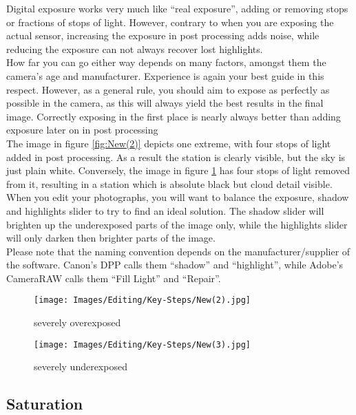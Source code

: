 Digital \gls{exposure} works very much like ``real \gls{exposure}'', adding or removing \glspl{stop} or fractions of \glspl{stop} of light. However, contrary to when you are exposing the actual \gls{sensor}, increasing the \gls{exposure} in post processing adds noise, while reducing the \gls{exposure} can not always recover lost highlights.
\\
How far you can go either way depends on many factors, amongst them the camera's age and manufacturer. Experience is again your best guide in this respect. However, as a general rule, you should aim to expose as perfectly as possible in the camera, as this will always yield the best results in the final image. Correctly exposing in the first place is nearly always better than adding \gls{exposure} later on in post processing
\\[\baselineskip]
The image in figure \ref{fig:New(2)} depicts one extreme, with four \glspl{stop} of light added in post processing. As a result the station is clearly visible, but the sky is just plain white. Conversely, the image in figure \ref{fig:New(3)} has four \glspl{stop} of light removed from it, resulting in a station which is absolute black but cloud detail visible.
\\[\baselineskip]
When you edit your photographs, you will want to balance the \gls{exposure}, shadow and highlights slider to try to find an ideal solution. The shadow slider will brighten up the underexposed parts of the image only, while the highlights slider will only darken then brighter parts of the image.
\\
Please note that the naming convention depends on the manufacturer/supplier of the software. Canon's DPP calls them ``shadow'' and ``highlight'', while Adobe's CameraRAW calls them ``Fill Light'' and ``Repair''.

\begin{figure}[htbp]
\begin{minipage}{.5\textwidth}
	\centering
		\texttt{[image: Images/Editing/Key-Steps/New(2).jpg]}
	\caption{severely overexposed}
	\label{fig:New(2)}
\end{minipage}
\begin{minipage}{.5\textwidth}
	\centering
		\texttt{[image: Images/Editing/Key-Steps/New(3).jpg]}
	\caption{severely underexposed}
	\label{fig:New(3)}
\end{minipage}
\end{figure}


\subsection{Saturation}

